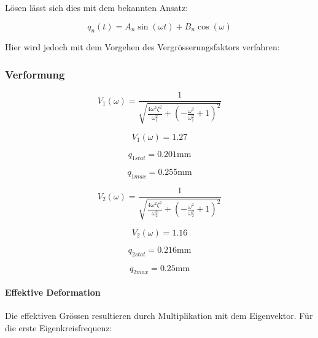 \documentclass[
  letterpaper,
  DIV=11]{scrreprt}
\let\oldparagraph\paragraph
\renewcommand{\paragraph}[1]{\oldparagraph{#1}\mbox{}}
\begin{document}
Lösen lässt sich dies mit dem bekannten Ansatz:

\[q_n(t) = A_n \sin(\omega t) + B_n \cos(\omega)\]

Hier wird jedoch mit dem Vorgehen des Vergrösserungsfaktors verfahren:

\hypertarget{verformung}{%
\subsubsection{Verformung}\label{verformung}}

\begin{equation*}V_{1}{\left(\omega \right)} = \frac{1}{\sqrt{\frac{4 \omega^{2} \zeta_{}^{2}}{\omega_{1}^{2}} + \left(- \frac{\omega^{2}}{\omega_{1}^{2}} + 1\right)^{2}}}\end{equation*}

\begin{equation*}V_{1}{\left(\omega \right)} = 1.27\end{equation*}

\begin{equation*}q_{1 stat} = 0.201 \text{mm}\end{equation*}

\begin{equation*}q_{1 max} = 0.255 \text{mm}\end{equation*}

\begin{equation*}V_{2}{\left(\omega \right)} = \frac{1}{\sqrt{\frac{4 \omega^{2} \zeta_{}^{2}}{\omega_{2}^{2}} + \left(- \frac{\omega^{2}}{\omega_{2}^{2}} + 1\right)^{2}}}\end{equation*}

\begin{equation*}V_{2}{\left(\omega \right)} = 1.16\end{equation*}

\begin{equation*}q_{2 stat} = 0.216 \text{mm}\end{equation*}

\begin{equation*}q_{2 max} = 0.25 \text{mm}\end{equation*}

\hypertarget{effektive-deformation}{%
\paragraph{Effektive Deformation}\label{effektive-deformation}}

Die effektiven Grössen resultieren durch Multiplikation mit dem
Eigenvektor. Für die erste Eigenkreisfrequenz:
\end{document}
